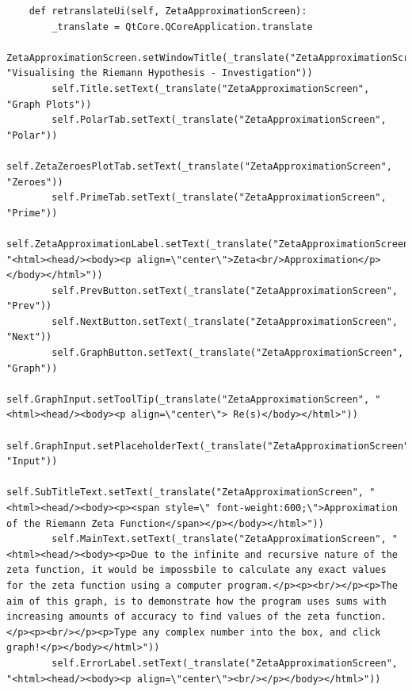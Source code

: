 \documentclass{article}
\begin{document}
\begin{lstlisting}
    def retranslateUi(self, ZetaApproximationScreen):
        _translate = QtCore.QCoreApplication.translate
        ZetaApproximationScreen.setWindowTitle(_translate("ZetaApproximationScreen", "Visualising the Riemann Hypothesis - Investigation"))
        self.Title.setText(_translate("ZetaApproximationScreen", "Graph Plots"))
        self.PolarTab.setText(_translate("ZetaApproximationScreen", "Polar"))
        self.ZetaZeroesPlotTab.setText(_translate("ZetaApproximationScreen", "Zeroes"))
        self.PrimeTab.setText(_translate("ZetaApproximationScreen", "Prime"))
        self.ZetaApproximationLabel.setText(_translate("ZetaApproximationScreen", "<html><head/><body><p align=\"center\">Zeta<br/>Approximation</p></body></html>"))
        self.PrevButton.setText(_translate("ZetaApproximationScreen", "Prev"))
        self.NextButton.setText(_translate("ZetaApproximationScreen", "Next"))
        self.GraphButton.setText(_translate("ZetaApproximationScreen", "Graph"))
        self.GraphInput.setToolTip(_translate("ZetaApproximationScreen", "<html><head/><body><p align=\"center\"> Re(s)</body></html>"))
        self.GraphInput.setPlaceholderText(_translate("ZetaApproximationScreen", "Input"))
        self.SubTitleText.setText(_translate("ZetaApproximationScreen", "<html><head/><body><p><span style=\" font-weight:600;\">Approximation of the Riemann Zeta Function</span></p></body></html>"))
        self.MainText.setText(_translate("ZetaApproximationScreen", "<html><head/><body><p>Due to the infinite and recursive nature of the zeta function, it would be impossbile to calculate any exact values for the zeta function using a computer program.</p><p><br/></p><p>The aim of this graph, is to demonstrate how the program uses sums with increasing amounts of accuracy to find values of the zeta function.</p><p><br/></p><p>Type any complex number into the box, and click graph!</p></body></html>"))
        self.ErrorLabel.setText(_translate("ZetaApproximationScreen", "<html><head/><body><p align=\"center\"><br/></p></body></html>"))
\end{lstlisting}
\end{document}
